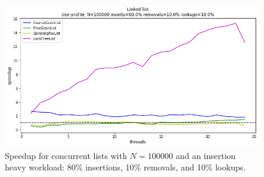 \documentclass[11pt]{article}
\begin{document}
\begin{figure}[h]
\centering
\includegraphics[width=1.0\linewidth]{figs/lateday/combined/lateday_combined_list_insert_80_lookup_10_removal_10}
\caption{
Speedup for concurrent lists with $N=100000$ and an insertion heavy workload:
80\% insertions, 10\% removals, and 10\% lookups.}
\label{fig:listInsertHeavy}
\end{figure}
\end{document}
